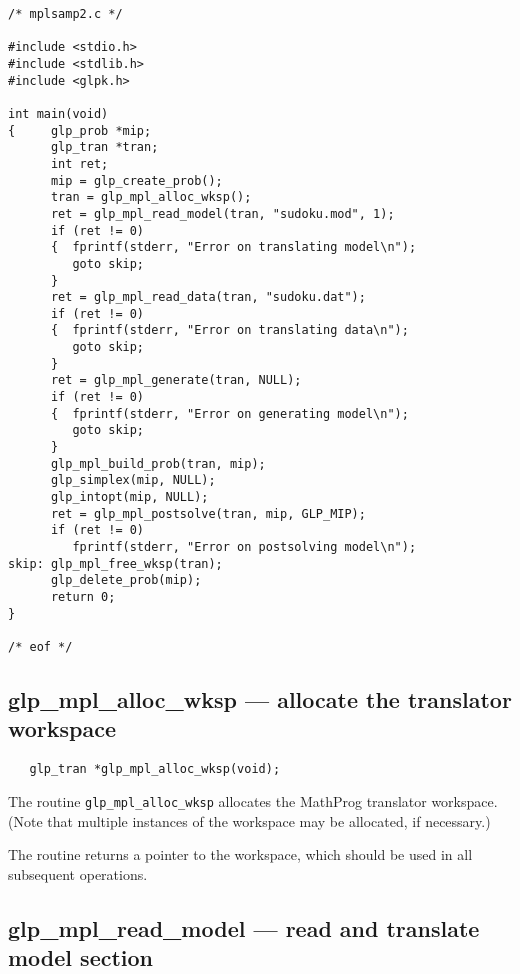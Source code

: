\bigskip

\begin{small}
\begin{verbatim}
/* mplsamp2.c */

#include <stdio.h>
#include <stdlib.h>
#include <glpk.h>

int main(void)
{     glp_prob *mip;
      glp_tran *tran;
      int ret;
      mip = glp_create_prob();
      tran = glp_mpl_alloc_wksp();
      ret = glp_mpl_read_model(tran, "sudoku.mod", 1);
      if (ret != 0)
      {  fprintf(stderr, "Error on translating model\n");
         goto skip;
      }
      ret = glp_mpl_read_data(tran, "sudoku.dat");
      if (ret != 0)
      {  fprintf(stderr, "Error on translating data\n");
         goto skip;
      }
      ret = glp_mpl_generate(tran, NULL);
      if (ret != 0)
      {  fprintf(stderr, "Error on generating model\n");
         goto skip;
      }
      glp_mpl_build_prob(tran, mip);
      glp_simplex(mip, NULL);
      glp_intopt(mip, NULL);
      ret = glp_mpl_postsolve(tran, mip, GLP_MIP);
      if (ret != 0)
         fprintf(stderr, "Error on postsolving model\n");
skip: glp_mpl_free_wksp(tran);
      glp_delete_prob(mip);
      return 0;
}

/* eof */
\end{verbatim}
\end{small}

\newpage

\subsection{glp\_mpl\_alloc\_wksp --- allocate the translator
workspace}

\synopsis

\begin{verbatim}
   glp_tran *glp_mpl_alloc_wksp(void);
\end{verbatim}

\description

The routine \verb|glp_mpl_alloc_wksp| allocates the MathProg translator
work\-space. (Note that multiple instances of the workspace may be
allocated, if necessary.)

\returns

The routine returns a pointer to the workspace, which should be used in
all subsequent operations.

\subsection{glp\_mpl\_read\_model --- read and translate model section}

